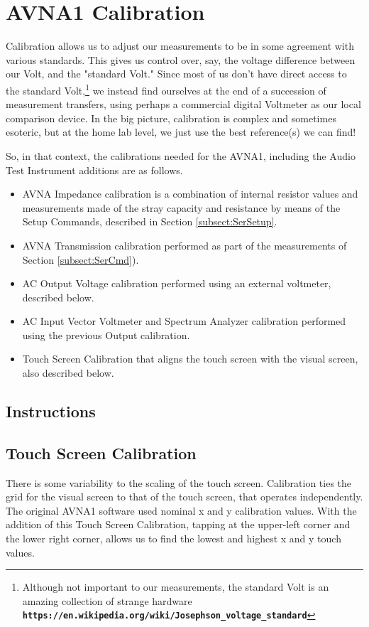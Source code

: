 \section{AVNA1 Calibration}
\label{sect:Cal}

Calibration allows us to adjust our measurements to be in some agreement with various standards.  This gives us control over, say, the voltage difference between our Volt, and the "standard Volt."  Since  most of us don't have direct access to the standard Volt,\footnote{Although not important to our measurements, the standard Volt is an amazing collection of strange hardware
\textbf{\texttt{https://en.wikipedia.org/wiki/Josephson\_voltage\_standard}}}
we instead find ourselves at the end of a succession of measurement transfers, using perhaps a commercial digital Voltmeter as our local comparison device.  In the big picture, calibration is complex and sometimes esoteric, but at the home lab level, we just use the best reference(s) we can find!

So, in that context, the calibrations needed for the AVNA1, including the Audio Test Instrument additions are as follows.

\begin{itemize}
  \item AVNA Impedance calibration is a combination of internal resistor values and measurements made of the stray capacity and resistance by means of the Setup Commands, described in Section \ref{subsect:SerSetup}.
  \item AVNA Transmission calibration performed as part of the measurements of Section \ref{subsect:SerCmd}).
  \item AC Output Voltage calibration performed using an external voltmeter, described below.
  \item AC Input Vector Voltmeter and Spectrum Analyzer calibration performed using the previous Output calibration.
  \item Touch Screen Calibration that aligns the touch screen with the visual screen, also described below.
\end{itemize}

\subsection{Instructions}
\label{subsect:CalInstr}
\subsection{Touch Screen Calibration} There is some variability to the scaling of the touch screen.  Calibration ties the grid for the visual screen to that of the touch screen, that operates independently.  The original AVNA1 software used nominal x and y calibration values.  With the addition of this Touch Screen Calibration,   tapping at the upper-left corner and the lower right corner, allows us to find the lowest and highest x and y touch values.

